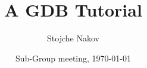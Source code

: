 \documentclass{beamer}
\title[A GDB Tutorial] {A GDB Tutorial}
\author[S.~Nakov] {Stojche Nakov}
\institute
{
  CS Departement\\
  Princeton University
}
\date[] {Sub-Group meeting, \today}
\begin{document}
\frame{\titlepage}
\end{document}
